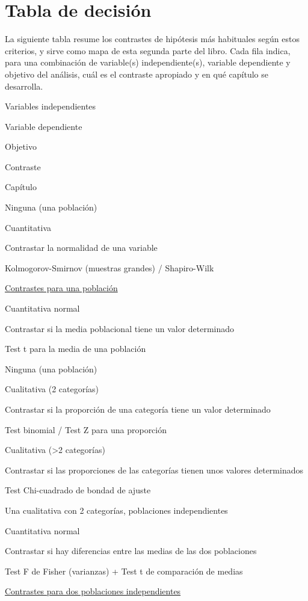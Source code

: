 \documentclass[
  spanish,
  a4paper,
]{scrreport}
\theoremstyle{definition}
\theoremstyle{definition}
\theoremstyle{remark}
\begin{document}
\section{Tabla de decisión}\label{tabla-de-decisiuxf3n}

La siguiente tabla resume los contrastes de hipótesis más habituales
según estos criterios, y sirve como mapa de esta segunda parte del
libro. Cada fila indica, para una combinación de variable(s)
independiente(s), variable dependiente y objetivo del análisis, cuál es
el contraste apropiado y en qué capítulo se desarrolla.

Variables independientes

Variable dependiente

Objetivo

Contraste

Capítulo

Ninguna (una población)

Cuantitativa

Contrastar la normalidad de una variable

Kolmogorov-Smirnov (muestras grandes) / Shapiro-Wilk

\href{11-contrastes-una-poblacion.qmd}{Contrastes para una población}

Cuantitativa normal

Contrastar si la media poblacional tiene un valor determinado

Test t para la media de una población

Ninguna (una población)

Cualitativa (2 categorías)

Contrastar si la proporción de una categoría tiene un valor determinado

Test binomial / Test Z para una proporción

Cualitativa (\textgreater2 categorías)

Contrastar si las proporciones de las categorías tienen unos valores
determinados

Test Chi-cuadrado de bondad de ajuste

Una cualitativa con 2 categorías, poblaciones independientes

Cuantitativa normal

Contrastar si hay diferencias entre las medias de las dos poblaciones

Test F de Fisher (varianzas) + Test t de comparación de medias

\href{12-contrastes-dos-poblaciones-independientes.qmd}{Contrastes para
dos poblaciones independientes}
\end{document}
